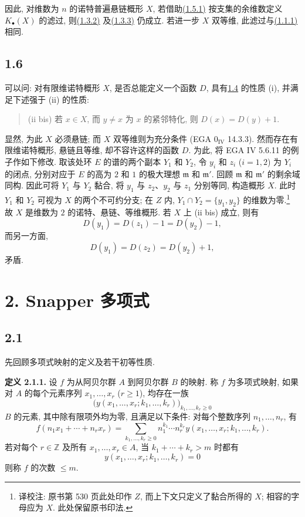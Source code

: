 因此, 对维数为 $n$ 的诺特普遍悬链概形 $X$, 若借助\hyperlink{sga6.e10.eq.1-5-1}{(1.5.1)} 按支集的余维数定义 $K_\bullet(X)$ 的滤过, 则\hyperlink{sga6.e10.thm.1-3-2}{(1.3.2)} 及\hyperlink{sga6.e10.cor.1-3-3}{(1.3.3)} 仍成立. 若进一步 $X$ 双等维, 此滤过与\hyperlink{sga6.e10.def.1-1-1}{(1.1.1)} 相同.
%
%
%

\subsection*{1.6} 可以问: 对有限维诺特概形 $X$, 是否总能定义一个函数 $D$, 具有\hyperlink{sga6.e10.rem.1-4}{1.4} 的性质 (i), 并满足下述强于 (ii) 的性质:
%
%
%
\begin{quote}
(ii bis) 若 $x\in X$, 而 $y\ne x$ 为 $x$ 的紧邻特化, 则 $D(x)=D(y)+1$.
%
\end{quote}

显然, 为此 $X$ 必须悬链; 而 $X$ 双等维则为充分条件 (EGA $0_{\mathrm{IV}}$ 14.3.3). 然而存在有限维诺特概形, 悬链且等维, 却不容许这样的函数 $D$. 为此, 将 EGA IV 5.6.11 的例子作如下修改. 取该处环 $E$ 的谱的两个副本 $Y_1$ 和 $Y_2$, 令 $y_i$ 和 $z_i$ ($i=1,2$) 为 $Y_i$ 的闭点, 分别对应于 $E$ 的高为 $2$ 和 $1$ 的极大理想 $\mathfrak m$ 和 $\mathfrak m'$. 回顾 $\mathfrak m$ 和 $\mathfrak m'$ 的剩余域同构. 因此可将 $Y_1$ 与 $Y_2$ 黏合, 将 $y_1$ 与 $z_2$、$y_2$ 与 $z_1$ 分别等同, 构造概形 $X$. 此时 $Y_1$ 和 $Y_2$ 可视为 $X$ 的两个不可约分支; 在 $Z$ 内, $Y_1\cap Y_2=\{y_1,y_2\}$ 的维数为零.\footnote{译校注: 原书第 530 页此处印作 $Z$, 而上下文只定义了黏合所得的 $X$; 相容的字母应为 $X$. 此处保留原书印法.} 故 $X$ 是维数为 $2$ 的诺特、悬链、等维概形. 若 $X$ 上 (ii bis) 成立, 则有
%
%
%
%
%
%
%
%
%
%
%
%
%
%
\[
D(y_1)=D(z_1)-1=D(y_2)-1,
\]
而另一方面,
\[
D(y_1)=D(z_2)=D(y_2)+1,
\]
矛盾.

\section*{2. Snapper 多项式}

\subsection*{2.1} 先回顾多项式映射的定义及若干初等性质.
%
%

\textbf{定义 2.1.1.} 设 $f$ 为从阿贝尔群 $A$ 到阿贝尔群 $B$ 的映射. 称 $f$ 为多项式映射, 如果对 $A$ 的每个元素序列 $x_1,\ldots,x_r$ ($r\geq1$), 均存在一族
%
%
%
\[
\bigl(y(x_1,\ldots,x_r;k_1,\ldots,k_r)\bigr)_{k_1,\ldots,k_r\geq0}
\]
$B$ 的元素, 其中除有限项外均为零, 且满足以下条件: 对每个整数序列 $n_1,\ldots,n_r$, 有
%
\[
f(n_1x_1+\cdots+n_rx_r)=
\sum_{k_1,\ldots,k_r\geq0}
n_1^{k_1}\cdots n_r^{k_r}
y(x_1,\ldots,x_r;k_1,\ldots,k_r).
\]
若对每个 $r\in\mathbb Z$ 及所有 $x_1,\ldots,x_r\in A$, 当 $k_1+\cdots+k_r>m$ 时都有
%
\[
y(x_1,\ldots,x_r;k_1,\ldots,k_r)=0
\]
则称 $f$ 的次数 $\leq m$.

